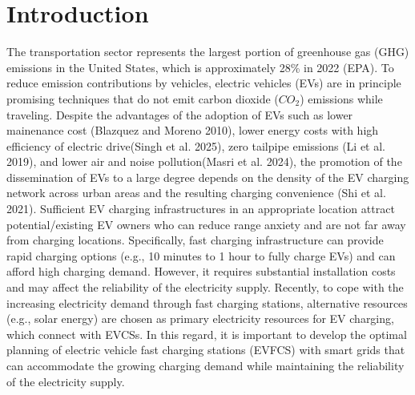 \documentclass[preprint,12pt]{elsarticle}
\begin{document}


\section{Introduction}
\label{sec1} %
The transportation sector represents the largest portion of greenhouse gas (GHG) emissions in the United States, which is approximately 28\% in 2022 (EPA). To reduce emission contributions by vehicles, electric vehicles (EVs) are in principle promising techniques that do not emit carbon dioxide ($CO_2$) emissions while traveling. Despite the advantages of the adoption of EVs such as lower mainenance cost (Blazquez and Moreno 2010), lower energy costs with high efficiency of electric drive(Singh et al. 2025), zero tailpipe emissions (Li et al. 2019), and lower air and noise pollution(Masri et al. 2024), the promotion of the dissemination of EVs to a large degree depends on the density of the EV charging network across urban areas and the resulting charging convenience (Shi et al. 2021). Sufficient EV charging infrastructures in an appropriate location attract potential/existing EV owners who can reduce range anxiety and are not far away from charging locations. Specifically, fast charging infrastructure can provide rapid charging options (e.g., 10 minutes to 1 hour to fully charge EVs) and can afford high charging demand. However, it requires substantial installation costs and may affect the reliability of the electricity supply. Recently, to cope with the increasing electricity demand through fast charging stations, alternative resources (e.g., solar energy) are chosen as primary electricity resources for EV charging, which connect with EVCSs. In this regard, it is important to develop the optimal planning of electric vehicle fast charging stations (EVFCS) with smart grids that can accommodate the growing charging demand while maintaining the reliability of the electricity supply. 

\vspace{0.5cm}
\end{document}

